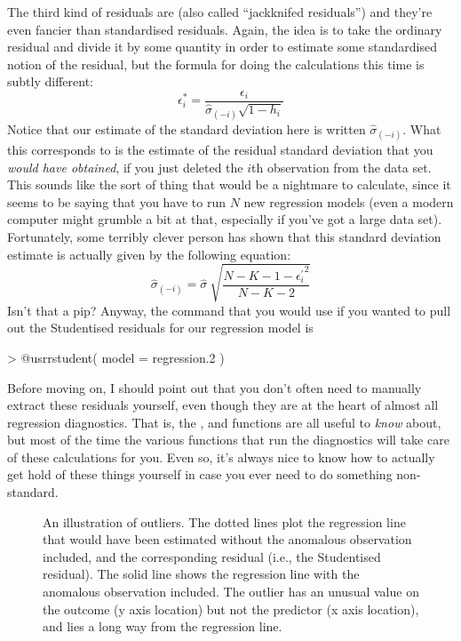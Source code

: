 The third kind of residuals are  (also called ``jackknifed residuals'') and they're even fancier than standardised residuals. Again, the idea is to take the ordinary residual and divide it by some quantity in order to estimate some standardised notion of the residual, but the formula for doing the calculations this time is subtly different:
$$
\epsilon_{i}^* = \frac{\epsilon_i}{\hat{\sigma}_{(-i)} \sqrt{1-h_i}}
$$
Notice that our estimate of the standard deviation here is written $\hat{\sigma}_{(-i)}$. What this corresponds to is the estimate of the residual standard deviation that you {\it would have obtained}, if you just deleted the $i$th observation from the data set. This sounds like the sort of thing that would be a nightmare to calculate, since it seems to be saying that you have to run $N$ new regression models (even a modern computer might grumble a bit at that, especially if you've got a large data set). Fortunately, some terribly clever person has shown that this standard deviation estimate is actually given by the following equation:
$$
\hat\sigma_{(-i)} = \hat{\sigma} \ \sqrt{\frac{N-K-1 - {\epsilon_{i}^\prime}^2}{N-K-2}}
$$
Isn't that a pip? Anyway, the command that you would use if you wanted to pull out the Studentised residuals for our regression model is
\begin{rblock1}
> @usr{rstudent( model = regression.2 )}
\end{rblock1}

Before moving on, I should point out that you don't often need to manually extract these residuals yourself, even though they are at the heart of almost all regression diagnostics. That is, the ,  and  functions are all useful to {\it know} about, but most of the time the various functions that run the diagnostics will take care of these calculations for you. Even so, it's always nice to know how to actually get hold of these things yourself in case you ever need to do something non-standard.







\begin{figure}[t]
\begin{center}
\caption{An illustration of outliers. The dotted lines plot the regression line that would have been estimated without the anomalous observation included, and the corresponding residual (i.e., the Studentised residual). The solid line shows the regression line with the anomalous observation included. The outlier has an unusual value on the outcome (y axis location) but not the predictor (x axis location), and lies a long way from the regression line.}
\HR
\label{fig:outlier}
\end{center}
\end{figure}

